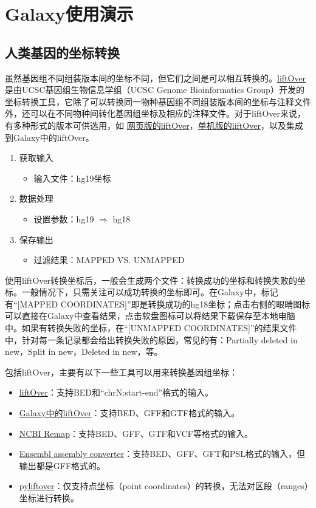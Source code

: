 \documentclass[11pt,a4paper,twoside]{book}
\begin{document}
\section{Galaxy使用演示}
\subsection{人类基因的坐标转换}
虽然基因组不同组装版本间的坐标不同，但它们之间是可以相互转换的。\href{http://genome.ucsc.edu/cgi-bin/hgLiftOver}{liftOver} 是由UCSC基因组生物信息学组（UCSC Genome Bioinformatics Group）开发的坐标转换工具，它除了可以转换同一物种基因组不同组装版本间的坐标与注释文件外，还可以在不同物种间转化基因组坐标及相应的注释文件。对于liftOver来说，有多种形式的版本可供选用，如 \href{http://genome.ucsc.edu/cgi-bin/hgLiftOver}{网页版的liftOver}，\href{http://hgdownload.cse.ucsc.edu/downloads.html\#source\_downloads}{单机版的liftOver}，以及集成到Galaxy中的liftOver。
\begin{enumerate}
    \item 获取输入
      \begin{itemize}
        \item 输入文件：hg19坐标
      \end{itemize}
    \item 数据处理
      \begin{itemize}
        \item 设置参数：hg19 $\Rightarrow$ hg18
      \end{itemize}
    \item 保存输出
      \begin{itemize}
        \item 过滤结果：MAPPED VS. UNMAPPED
      \end{itemize}
\end{enumerate}

使用liftOver转换坐标后，一般会生成两个文件：转换成功的坐标和转换失败的坐标。一般情况下，只需关注可以成功转换的坐标即可。在Galaxy中，标记有“[MAPPED COORDINATES]”即是转换成功的hg18坐标；点击右侧的眼睛图标可以直接在Galaxy中查看结果，点击软盘图标可以将结果下载保存至本地电脑中。如果有转换失败的坐标，在“[UNMAPPED COORDINATES]”的结果文件中，针对每一条记录都会给出转换失败的原因，常见的有：Partially deleted in new，Split in new，Deleted in new，等。

包括liftOver，主要有以下一些工具可以用来转换基因组坐标：
\begin{itemize}
  \item \href{http://genome.ucsc.edu/cgi-bin/hgLiftOver}{liftOver}：支持BED和“chrN:start-end”格式的输入。
  \item \href{https://usegalaxy.org/}{Galaxy中的liftOver}：支持BED、GFF和GTF格式的输入。
  \item \href{http://www.ncbi.nlm.nih.gov/genome/tools/remap}{NCBI Remap}：支持BED、GFF、GTF和VCF等格式的输入。
  \item \href{http://asia.ensembl.org/Homo\_sapiens/UserData/SelectFeatures}{Ensembl assembly converter}：支持BED、GFF、GFT和PSL格式的输入，但输出都是GFF格式的。
  \item \href{https://pypi.python.org/pypi/pyliftover}{pyliftover}：仅支持点坐标（point coordinates）的转换，无法对区段（ranges）坐标进行转换。
\end{itemize}
\end{document}
